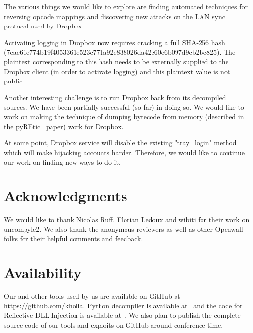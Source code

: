\documentclass[letterpaper,twocolumn,10pt]{article}
\makeatletter
\newcommand*\wrapletters[1]{\wr@pletters#1\@nil}
\def\wr@pletters#1#2\@nil{#1\allowbreak\if&#2&\else\wr@pletters#2\@nil\fi}
\makeatother
\begin{document}
The various things we would like to explore are finding automated techniques
for reversing opcode mappings and discovering new attacks on the LAN sync
protocol used by Dropbox.

Activating logging in Dropbox now requires cracking a full SHA-256 hash
(\wrapletters{e27eae61e774b19f4053361e523c771a92e838026da42c60e6b097d9cb2bc825}).
The plaintext corresponding to this hash needs to be externally supplied to
the Dropbox client (in order to activate logging) and this plaintext value is
not public.

Another interesting challenge is to run Dropbox back from its decompiled
sources. We have been partially successful (so far) in doing so. We would like
to work on making the technique of dumping bytecode from memory (described in
the pyREtic~\cite{smith2010} paper) work for Dropbox.

At some point, Dropbox service will disable the existing "tray\_login" method
which will make hijacking accounts harder. Therefore, we would like to continue
our work on finding new ways to do it.

\section{Acknowledgments}

We would like to thank Nicolas Ruff, Florian Ledoux and wibiti for their work
on uncompyle2. We also thank the anonymous reviewers as well as other Openwall
folks for their helpful comments and feedback.

\section{Availability}

Our and other tools used by us are available on GitHub at
\url{https://github.com/kholia}. Python decompiler is available
at~\cite{uncompyle2} and the code for Reflective DLL Injection is available
at~\cite{reflective}. We also plan to publish the complete source code of our
tools and exploits on GitHub around conference time.

\begingroup
\raggedright
{\footnotesize 
\sloppy
}
\endgroup
\end{document}
